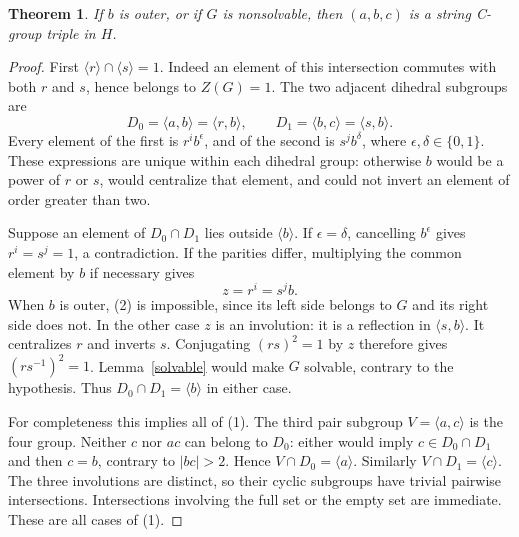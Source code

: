 \documentclass[11pt,a4paper]{article}
\newtheorem{theorem}{Theorem}\newtheorem{lemma}[theorem]{Lemma}
\begin{document}
\begin{theorem}\label{ip}
If $b$ is outer, or if $G$ is nonsolvable, then $(a,b,c)$ is a
string C-group triple in $H$.
\end{theorem}
\begin{proof}
First $\langle r\rangle\cap\langle s\rangle=1$. Indeed an element
of this intersection commutes with both $r$ and $s$, hence belongs
to $Z(G)=1$. The two adjacent dihedral subgroups are
\[
 D_0=\langle a,b\rangle=\langle r,b\rangle,
 \qquad D_1=\langle b,c\rangle=\langle s,b\rangle.
\]
Every element of the first is $r^i b^\epsilon$, and of the second
is $s^j b^\delta$, where $\epsilon,\delta\in\{0,1\}$.
These expressions are unique within each dihedral group: otherwise
$b$ would be a power of $r$ or $s$, would centralize that element,
and could not invert an element of order greater than two.

Suppose an element of $D_0\cap D_1$ lies outside $\langle b\rangle$.
If $\epsilon=\delta$, cancelling $b^\epsilon$ gives
$r^i=s^j=1$, a contradiction. If the parities differ, multiplying
the common element by $b$ if necessary gives
\[
                  z=r^i=s^j b.                         \tag{2}
\]
When $b$ is outer, (2) is impossible, since its left side belongs
to $G$ and its right side does not. In the other case $z$ is an
involution: it is a reflection in $\langle s,b\rangle$.
It centralizes $r$ and inverts $s$. Conjugating $(rs)^2=1$ by $z$
therefore gives $(rs^{-1})^2=1$. Lemma~\ref{solvable} would make
$G$ solvable, contrary to the hypothesis. Thus
$D_0\cap D_1=\langle b\rangle$ in either case.

For completeness this implies all of (1). The third pair subgroup
$V=\langle a,c\rangle$ is the four group. Neither $c$ nor $ac$
can belong to $D_0$: either would imply $c\in D_0\cap D_1$
and then $c=b$, contrary to $|bc|>2$. Hence
$V\cap D_0=\langle a\rangle$. Similarly
$V\cap D_1=\langle c\rangle$. The three involutions are distinct,
so their cyclic subgroups have trivial pairwise intersections.
Intersections involving the full set or the empty set are immediate.
These are all cases of (1).
\end{proof}
\end{document}
